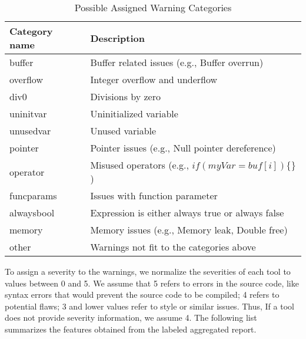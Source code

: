 \begin{table}
  \begin{center}
      \begin{tabular}{ll}\hline
        Category name & Description \\
      \hline
        buffer &  Buffer related issues (e.g., Buffer overrun) \\
        overflow & Integer overflow and underflow \\
        div0 & Divisions by zero \\
        uninitvar & Uninitialized variable \\
        unusedvar & Unused variable \\
        pointer & Pointer issues (e.g., Null pointer dereference) \\
        operator & Misused operators (e.g., $if(myVar = buf[i])\{\}$) \\
        funcparams & Issues with function parameter \\
        alwaysbool & Expression is either always true or always false \\
        memory & Memory issues (e.g., Memory leak, Double free)\\
        other & Warnings not fit to the categories above \\ \hline
      \end{tabular}
      \caption{Possible Assigned Warning Categories}\label{tab:warning_categories}
  \end{center}
\end{table}

To assign a severity to the warnings, we normalize the severities of each tool
to values between 0 and 5. We assume that 5 refers to errors in the source
code, like syntax errors that would prevent the source code to be compiled; 4
refers to potential flaws; 3 and lower values refer to style or similar issues.
Thus, If a tool does not provide severity information, we assume 4. The
following list summarizes the features obtained from the labeled aggregated
report.

